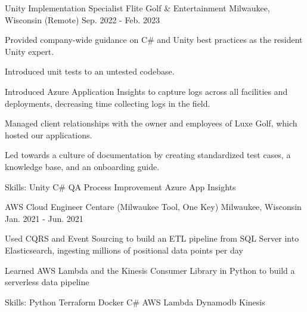 \begin{cventries}
  \cventry
    {Unity Implementation Specialist} %
    {Flite Golf \& Entertainment} %
    {Milwaukee, Wisconsin (Remote)} %
    {Sep. 2022 - Feb. 2023} %
    {
      \begin{cvitems} %
        \item {Provided company-wide guidance on C\# and Unity best practices as the resident Unity expert.}
        \item {Introduced unit tests to an untested codebase.}
        \item {Introduced Azure Application Insights to capture logs across all facilities and deployments, decreasing time collecting logs in the field.}
        \item {Managed client relationships with the owner and employees of Luxe Golf, which hosted our applications.}
        \item {Led towards a culture of documentation by creating standardized test cases, a knowledge base, and an onboarding guide.}
        \item {Skills: Unity \textbullet{} C\# \textbullet{} QA Process Improvement \textbullet{} Azure App Insights}
      \end{cvitems}
    }

  \cventry
    {AWS Cloud Engineer} %
    {Centare (Milwaukee Tool, One Key)} %
    {Milwaukee, Wisconsin} %
    {Jan. 2021 - Jun. 2021} %
    {
      \begin{cvitems} %
        \item {Used CQRS and Event Sourcing to build an ETL pipeline from SQL Server into Elasticsearch, ingesting millions of positional data points per day }
        \item {Learned AWS Lambda and the Kinesis Consumer Library in Python to build a serverless data pipeline}
        \item {Skills: Python \textbullet{} Terraform \textbullet{} Docker \textbullet{} C\# \textbullet{} AWS Lambda \textbullet{} Dynamodb \textbullet{} Kinesis}
      \end{cvitems}
 }


\end{cventries}
